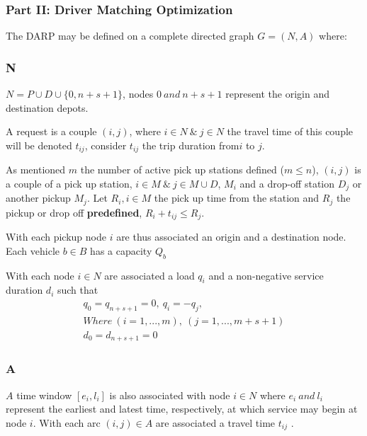 \documentclass{article}
\begin{document}
\subsubsection{Part II: Driver Matching Optimization}
\label{subsec:darp}

The DARP may be defined on a complete directed graph $G = (N,A)$ where:


\subsubsection*{N}

$N = P \cup D \cup \{0, n + s + 1\}$, nodes $0 \ and \  n + s + 1$ represent the origin and destination depots.

A request is a couple $(i,j)$, where $i \in N\  \& \  j \in N $ the travel time of this couple will be denoted $t_{ij}$,  consider $t_{ij}$ the trip duration from$i$ to $j$.

As mentioned $m$ the number of active pick up stations defined ($m \leqslant n$),  $(i,j)$ is a couple of a pick up station, $i \in M\ \& \ j \in M \cup D$, $M_i$ and a drop-off station $D_j$ or another pickup $M_j$.
Let $R_i, i \in M$ the pick up time from the station and $R_j$ the pickup or drop off \textbf{predefined}, $R_i + t_{ij} \leqslant R_j$.

With each pickup node $i$ are thus associated an origin and a destination node. Each vehicle $b \in B$ has a capacity $Q_b$


With each node $i \in N$ are associated a load $q_i$ and a non-negative service duration $d_i$ such that 
\begin{equation*}
\begin{array}{l}
q_0 = q_{n+s+1} = 0, \ q_i = - q_j,\\
Where \  (i = 1, . . . , m),\ (j = 1, ... , m+s+1) \\
d_0 = d_{n+s+1} = 0
\end{array}
\end{equation*}

\subsubsection*{A}

$A$ time window $[e_i, l_i]$ is also associated with node $i \in N$ where $ e_i\ and\ l_i$ represent the earliest and latest time,
respectively, at which service may begin at node $i$. With each arc $(i, j) \in A$ are associated a travel time $t_{ij}$ .
\end{document}
